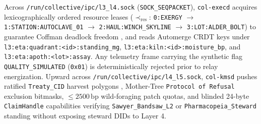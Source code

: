 Across \texttt{/run/collective/ipc/l3\_l4.sock} (\texttt{SOCK\_SEQPACKET}), \texttt{col-execd} acquires lexicographically ordered resource leases
($\prec_{\mathrm{res}}$: \texttt{0:EXERGY} $\to$ \texttt{1:STATION:AUTOCLAVE\_01} $\to$ \texttt{2:HAUL:WINCH\_SKYLINE} $\to$
\texttt{3:LOT:ALDER\_BOLT}) to guarantee Coffman deadlock freedom \parencite{coffman1971deadlocks}, and reads Automerge CRDT keys under
\texttt{l3:eta:quadrant:<id>:standing\_mg}, \texttt{l3:eta:kiln:<id>:moisture\_bp}, and \texttt{l3:eta:apoth:<lot>:assay}. Any telemetry frame
carrying the synthetic flag \texttt{QUALITY\_SIMULATED} (\texttt{0x01}) is deterministically rejected prior to relay energization. Upward across
\texttt{/run/collective/ipc/l4\_l5.sock}, \texttt{col-kmsd} pushes ratified \texttt{Treaty\_CID} harvest polygons \parencite{grigg2004},
Mother-Tree \texttt{Protocol of Refusal} exclusion bitmasks, $\le 2500\,\mathrm{bp}$ wild-foraging patch quotas, and blinded 24-byte
\texttt{ClaimHandle} capabilities \parencite{miller2006robust} verifying \texttt{Sawyer\_Bandsaw\_L2} or \texttt{Pharmacopeia\_Steward} standing
without exposing steward DIDs to Layer 4.

